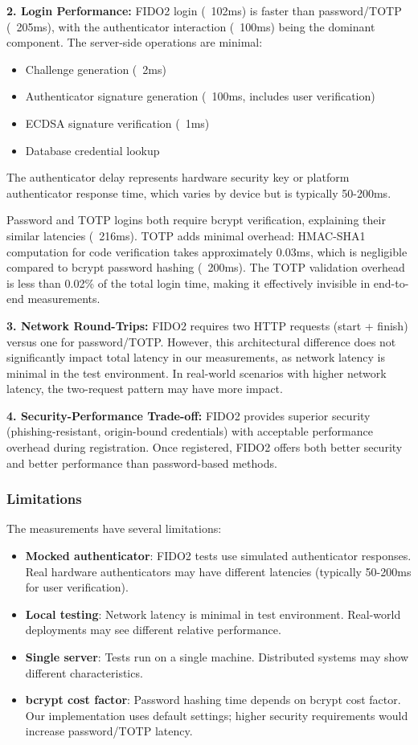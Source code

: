 \textbf{2. Login Performance:}
FIDO2 login (~102ms) is faster than password/TOTP (~205ms), with the authenticator interaction (~100ms) being the dominant component. The server-side operations are minimal:
\begin{itemize}
    \item Challenge generation (~2ms)
    \item Authenticator signature generation (~100ms, includes user verification)
    \item ECDSA signature verification (~1ms)
    \item Database credential lookup
\end{itemize}
The authenticator delay represents hardware security key or platform authenticator response time, which varies by device but is typically 50-200ms.

Password and TOTP logins both require bcrypt verification, explaining their similar latencies (~216ms). TOTP adds minimal overhead: HMAC-SHA1 computation for code verification takes approximately 0.03ms, which is negligible compared to bcrypt password hashing (~200ms). The TOTP validation overhead is less than 0.02\% of the total login time, making it effectively invisible in end-to-end measurements.

\textbf{3. Network Round-Trips:}
FIDO2 requires two HTTP requests (start + finish) versus one for password/TOTP. However, this architectural difference does not significantly impact total latency in our measurements, as network latency is minimal in the test environment. In real-world scenarios with higher network latency, the two-request pattern may have more impact.

\textbf{4. Security-Performance Trade-off:}
FIDO2 provides superior security (phishing-resistant, origin-bound credentials) with acceptable performance overhead during registration. Once registered, FIDO2 offers both better security and better performance than password-based methods.

\subsubsection{Limitations}

The measurements have several limitations:
\begin{itemize}
    \item \textbf{Mocked authenticator}: FIDO2 tests use simulated authenticator responses. Real hardware authenticators may have different latencies (typically 50-200ms for user verification).
    \item \textbf{Local testing}: Network latency is minimal in test environment. Real-world deployments may see different relative performance.
    \item \textbf{Single server}: Tests run on a single machine. Distributed systems may show different characteristics.
    \item \textbf{bcrypt cost factor}: Password hashing time depends on bcrypt cost factor. Our implementation uses default settings; higher security requirements would increase password/TOTP latency.
\end{itemize}

